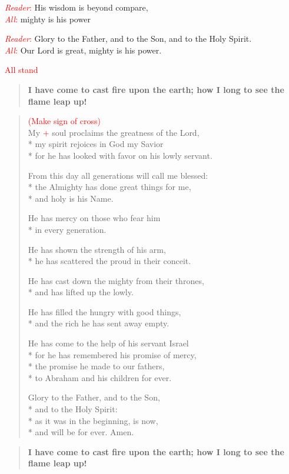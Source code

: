\documentclass[letterpaper,14pt]{extarticle}
\newcommand{\side}[1]{\flagverse{\textcolor{red}{\textit{#1}}:}}
\newcommand{\sidestar}[1]{\textcolor{red}{\textit{#1}:}}
\newcommand{\rednote}[1]{\textcolor{red}{#1}}
\newlength{\oldindent}
\newcommand{\antiphon}[2]{
	\setlength{\oldindent}{\vindent}
	\setlength{\vindent}{0em}
	\begin{verse}
	\side{#1} \textbf{#2}
	\end{verse}
	\setlength{\vindent}{\oldindent}
}
\begin{document}
\sidestar{Reader} His wisdom is beyond compare, \\
\sidestar{All} mighty is his power

\sidestar{Reader} Glory to the Father, and to the Son, and to the Holy Spirit. \\
\sidestar{All} Our Lord is great, mighty is his power.

\rednote{All stand}
\antiphon{Leader}{I have come to cast fire upon the earth; how I long to see
the flame leap up!}
\setlength{\stanzaskip}{0.25\baselineskip}
\begin{verse}
\rednote{(Make sign of cross)}\\
\side{All} My \rednote{+} soul proclaims the greatness of the Lord, \\*
my spirit rejoices in God my Savior \\*
for he has looked with favor on his lowly servant.

From this day all generations will call me blessed: \\*
the Almighty has done great things for me, \\*
and holy is his Name.

He has mercy on those who fear him \\*
in every generation.

He has shown the strength of his arm, \\*
he has scattered the proud in their conceit.

He has cast down the mighty from their thrones, \\*
and has lifted up the lowly.

He has filled the hungry with good things, \\*
and the rich he has sent away empty.

He has come to the help of his servant Israel \\*
for he has remembered his promise of mercy, \\*
the promise he made to our fathers, \\*
to Abraham and his children for ever.

Glory to the Father, and to the Son, \\*
and to the Holy Spirit: \\*
as it was in the beginning, is now, \\*
and will be for ever. Amen.
\end{verse}
\setlength{\stanzaskip}{0.75\baselineskip}
\antiphon{All}{I have come to cast fire upon the earth; how I long to see
the flame leap up!}
\end{document}
